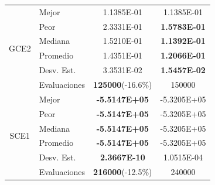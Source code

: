 \begin{table}
\begin{tabular}{clcc}
		
		\multirow{6}{*}{GCE2} & Mejor        &1.1385E-01&1.1385E-01\\
		& Peor         &2.3331E-01&\textbf{1.5783E-01}\\
		& Mediana      &1.5210E-01&\textbf{1.1392E-01 }\\
		& Promedio     &1.4351E-01&\textbf{1.2066E-01  }\\
		& Desv. Est.   &3.3531E-02&\textbf{1.5457E-02 }\\
		& Evaluaciones &\textbf{125000}(-16.6\%)&150000 \\
		\hline
		\multirow{6}{*}{SCE1} & Mejor        &\textbf{ -5.5147E+05}&-5.3205E+05 \\
		& Peor         &\textbf{ -5.5147E+05}&-5.3205E+05\\
		& Mediana      &\textbf{ -5.5147E+05}&-5.3205E+05\\
		& Promedio     & \textbf{-5.5147E+05}&-5.3205E+05\\
		& Desv. Est.   &\textbf{2.3667E-10}&1.0515E-04\\
		& Evaluaciones &\textbf{216000}(-12.5\%)&240000 \\
		
		
		\hline
	\end{tabular}
\end{table}


